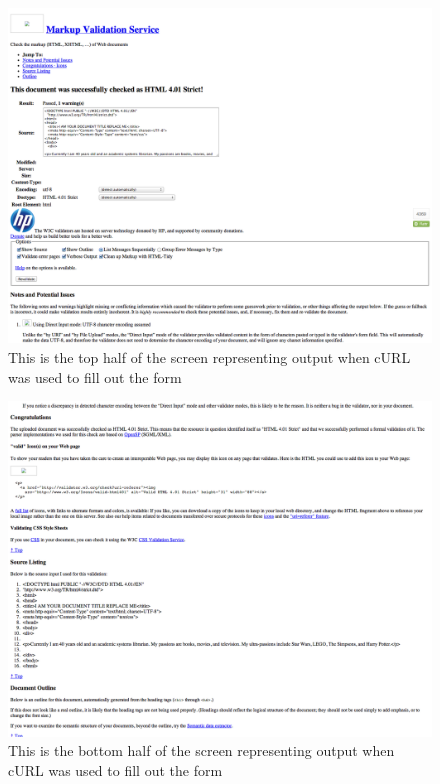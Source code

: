 \documentclass{article}
\begin{document}
\begin{figure}[H]
\includegraphics[scale=0.30]{w3cMarkupValidationServiceCurl01}
\caption{This is the top half of the screen representing output when cURL was used to fill out the form}
\end{figure}

\begin{figure}[H]
\includegraphics[scale=0.30]{w3cMarkupValidationServiceCurl02}
\caption{This is the bottom half of the screen representing output when cURL was used to fill out the form}
\end{figure}

\newpage
\end{document}
